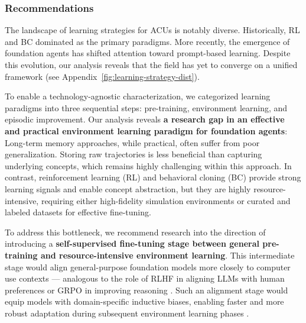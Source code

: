 \subsubsection{Recommendations}
The landscape of learning strategies for ACUs is notably diverse.
Historically, RL and BC dominated as the primary paradigms. More recently, the emergence of foundation agents has shifted attention toward prompt-based learning. Despite this evolution, our analysis reveals that the field has yet to converge on a unified framework (see Appendix~\cref{fig:learning-strategy-dist}).

To enable a technology-agnostic characterization, we categorized learning paradigms into three sequential steps: pre-training, environment learning, and episodic improvement.
Our analysis reveals \textbf{a research gap in an effective and practical environment learning paradigm for foundation agents}:
Long-term memory approaches, while practical, often suffer from poor generalization. Storing raw trajectories is less beneficial than capturing underlying concepts, which remains highly challenging within this approach.
In contrast, reinforcement learning (RL) and behavioral cloning (BC) provide strong learning signals and enable concept abstraction, but they are highly resource-intensive, requiring either high-fidelity simulation environments or curated and labeled datasets for effective fine-tuning.

To address this bottleneck, we recommend research into the direction of introducing a \textbf{self-supervised fine-tuning stage between general pre-training and resource-intensive environment learning}. This intermediate stage would align general-purpose foundation models more closely to computer use contexts --- analogous to the role of RLHF in aligning LLMs with human preferences \citep{ziegler_fine_2020} or GRPO in improving reasoning \citep{shao2024deepseekmathpushinglimitsmathematical}. Such an alignment stage would equip models with domain-specific inductive biases, enabling faster and more robust adaptation during subsequent environment learning phases \citep{ouyang_training_2022}.

